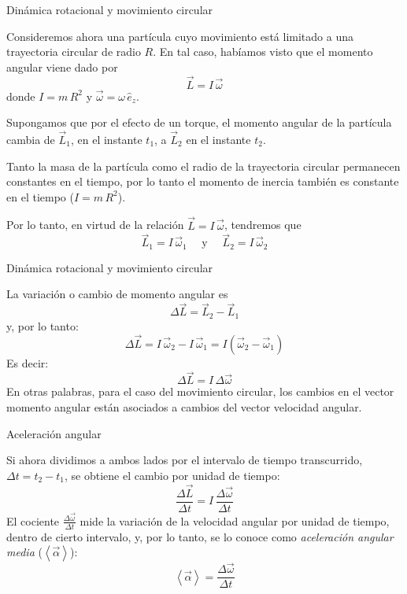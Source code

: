 \documentclass[11pt,handout,aspectratio=1610]{beamer}
\newcommand{\fdiff}[2]{\dfrac{\text{d} #1}{\text{d} #2}}
\newcommand{\valmed}[1]{\left\langle #1 \right\rangle}
\newcommand{\vs}{\vspace{11pt}}
\begin{document}
\begin{frame}{Dinámica rotacional y movimiento circular}
    
Consideremos ahora una partícula cuyo movimiento está limitado a una trayectoria circular de radio $R$. En tal caso, habíamos visto que el momento angular viene dado por $$\vec{L} = I \, \vec{\omega}$$ donde $I = m \, R^2$ y $\vec{\omega} = \omega \, \hat{e}_z$.

\vs 

Supongamos que por el efecto de un torque, el momento angular de la partícula cambia de $\vec{L}_1$, en el instante $t_1$, a $\vec{L}_2$ en el instante $t_2$.

\vs

Tanto la masa de la partícula como el radio de la trayectoria circular permanecen constantes en el tiempo, por lo tanto el momento de inercia también es constante en el tiempo ($I = m \, R^2$).

\vs 

Por lo tanto, en virtud de la relación $\vec{L} = I \, \vec{\omega}$, tendremos que $$\vec{L}_1 = I \, \vec{\omega}_1 \quad \text{ y } \quad \vec{L}_2 = I \, \vec{\omega}_2$$


\end{frame}

\begin{frame}{Dinámica rotacional y movimiento circular}

    La variación o cambio de momento angular es $$\Delta \vec{L} = \vec{L}_2 - \vec{L}_1 $$ y, por lo tanto: $$\Delta \vec{L} = I \, \vec{\omega}_2 - I \, \vec{\omega}_1 = I \left(\vec{\omega}_2 - \vec{\omega}_1\right) $$ Es decir: $$ \Delta \vec{L} = I \, \Delta \vec{\omega} $$ En otras palabras, para el caso del movimiento circular, los cambios en el vector momento angular están asociados a cambios del vector velocidad angular.

\end{frame}

\begin{frame}{Aceleración angular}

    Si ahora dividimos a ambos lados por el intervalo de tiempo transcurrido, $\Delta t = t_2 - t_1$, se obtiene el cambio por unidad de tiempo: $$ \frac{\Delta \vec{L}}{\Delta t} = I \, \frac{\Delta \vec{\omega}}{\Delta t} $$ El cociente $\frac{\Delta \vec{\omega}}{\Delta t}$ mide la variación de la velocidad angular por unidad de tiempo, dentro de cierto intervalo, y, por lo tanto, se lo conoce como \emph{aceleración angular media} ($\valmed{\vec{\alpha}}$): $$\valmed{\vec{\alpha}} = \frac{\Delta \vec{\omega}}{\Delta t}$$

\end{frame}
\end{document}
